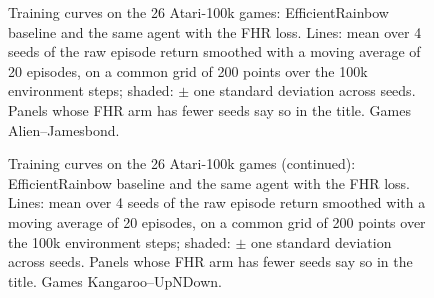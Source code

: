 \begin{figure}[p]
  \centering
  
  \caption{Training curves on the 26 Atari-100k games: EfficientRainbow baseline and the same agent with the FHR loss. Lines: mean over 4 seeds of the raw episode return smoothed with a moving average of 20 episodes, on a common grid of 200 points over the 100k environment steps; shaded: $\pm$ one standard deviation across seeds. Panels whose FHR arm has fewer seeds say so in the title. Games Alien--Jamesbond.}
  \label{fig:atari100k-learning-curves-a}
\end{figure}

\begin{figure}[p]
  \centering
  
  \caption{Training curves on the 26 Atari-100k games (continued): EfficientRainbow baseline and the same agent with the FHR loss. Lines: mean over 4 seeds of the raw episode return smoothed with a moving average of 20 episodes, on a common grid of 200 points over the 100k environment steps; shaded: $\pm$ one standard deviation across seeds. Panels whose FHR arm has fewer seeds say so in the title. Games Kangaroo--UpNDown.}
  \label{fig:atari100k-learning-curves-b}
\end{figure}
